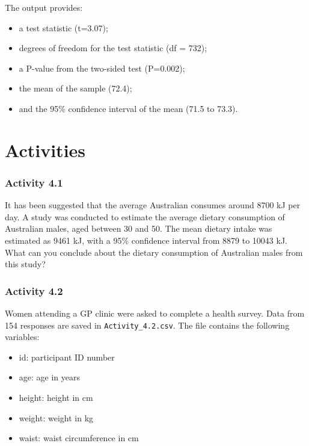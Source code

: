 \documentclass[
  a4paper,
]{memoir}
\providecommand{\tightlist}{%
  \setlength{\itemsep}{0pt}\setlength{\parskip}{0pt}}
\begin{document}
The output provides:

\begin{itemize}
\tightlist
\item
  a test statistic (t=3.07);
\item
  degrees of freedom for the test statistic (df = 732);
\item
  a P-value from the two-sided test (P=0.002);
\item
  the mean of the sample (72.4);
\item
  and the 95\% confidence interval of the mean (71.5 to 73.3).
\end{itemize}

\newpage{}


\chapter*{Activities}\label{activities-3}


\subsection*{Activity 4.1}\label{activity-4.1}

It has been suggested that the average Australian consumes around 8700
kJ per day. A study was conducted to estimate the average dietary
consumption of Australian males, aged between 30 and 50. The mean
dietary intake was estimated as 9461 kJ, with a 95\% confidence interval
from 8879 to 10043 kJ. What can you conclude about the dietary
consumption of Australian males from this study?

\subsection*{Activity 4.2}\label{activity-4.2}

Women attending a GP clinic were asked to complete a health survey. Data
from 154 responses are saved in \texttt{Activity\_4.2.csv}. The file
contains the following variables:

\begin{itemize}
\tightlist
\item
  id: participant ID number
\item
  age: age in years
\item
  height: height in cm
\item
  weight: weight in kg
\item
  waist: waist circumference in cm
\end{itemize}
\end{document}
